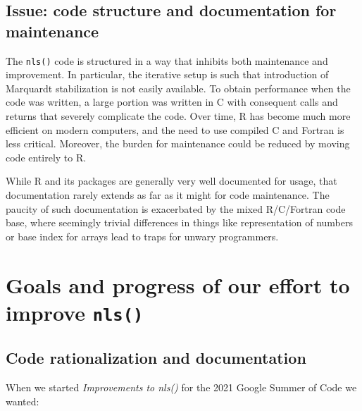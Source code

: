 \documentclass[
]{article}
\begin{document}
\hypertarget{issue-code-structure-and-documentation-for-maintenance}{%
\subsection{Issue: code structure and documentation for
maintenance}\label{issue-code-structure-and-documentation-for-maintenance}}

The \texttt{nls()} code is structured in a way that inhibits both
maintenance and improvement. In particular, the iterative setup is such
that introduction of Marquardt stabilization is not easily available. To
obtain performance when the code was written, a large portion was
written in C with consequent calls and returns that severely complicate
the code. Over time, R has become much more efficient on modern
computers, and the need to use compiled C and Fortran is less critical.
Moreover, the burden for maintenance could be reduced by moving code
entirely to R.

While R and its packages are generally very well documented for usage,
that documentation rarely extends as far as it might for code
maintenance. The paucity of such documentation is exacerbated by the
mixed R/C/Fortran code base, where seemingly trivial differences in
things like representation of numbers or base index for arrays lead to
traps for unwary programmers.

\hypertarget{goals-and-progress-of-our-effort-to-improve-nls}{%
\section{\texorpdfstring{Goals and progress of our effort to improve
\texttt{nls()}}{Goals and progress of our effort to improve nls()}}\label{goals-and-progress-of-our-effort-to-improve-nls}}

\hypertarget{code-rationalization-and-documentation}{%
\subsection{Code rationalization and
documentation}\label{code-rationalization-and-documentation}}

When we started \emph{Improvements to nls()} for the 2021 Google Summer
of Code we wanted:
\end{document}
